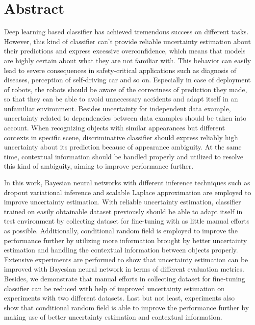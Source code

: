 
\thispagestyle{plain}

\section*{Abstract}
Deep learning based classifier has achieved tremendous success on different tasks. However, this kind of classifier can't provide reliable uncertainty estimation about their predictions and express excessive overconfidence, which means that models are highly certain about what they are not familiar with. This behavior can easily lead to severe consequences in safety-critical applications such as diagnosis of diseases, perception of self-driving car and so on. Especially in case of deployment of robots, the robots should be aware of the correctness of prediction they made, so that they can be able to avoid unnecessary accidents and adapt itself in an unfamiliar environment. Besides uncertainty for independent data example, uncertainty related to dependencies between data examples should be taken into account. When recognizing objects with similar appearances but different contexts in specific scene, discriminative classifier should express reliably high uncertainty about its prediction because of appearance ambiguity. At the same time, contextual information should be handled properly and utilized to resolve this kind of ambiguity, aiming to improve performance further. 

In this work, Bayesian neural networks with different inference techniques such as dropout variational inference and scalable Laplace approximation are employed to improve uncertainty estimation. With reliable uncertainty estimation, classifier trained on easily obtainable dataset previously should be able to adapt itself in test environment by collecting dataset for fine-tuning with as little manual efforts as possible. Additionally, conditional random field is employed to improve the performance further by utilizing more information brought by better uncertainty estimation and handling the contextual information between objects properly. Extensive experiments are performed to show that uncertainty estimation can be improved with Bayesian neural network in terms of different evaluation metrics. Besides, we demonstrate that manual efforts in collecting dataset for fine-tuning classifier can be reduced with help of improved uncertainty estimation on experiments with two different datasets. Last but not least, experiments also show that conditional random field is able to improve the performance further by making use of better uncertainty estimation and contextual information.

